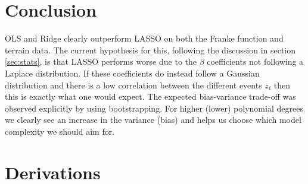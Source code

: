 \documentclass[%
reprint,
amsmath,amssymb,
aps,
pra,
]{revtex4-2}
\begin{document}
\section{Conclusion}
OLS and Ridge clearly outperform LASSO on both the Franke function and terrain data. The current hypothesis for this, following the discussion in section \ref{sec:stats}, is that LASSO performs worse due to the $\beta$ coefficients not following a Laplace distribution. If these coefficients do instead follow a Gaussian distribution and there is a low correlation between the different events $z_i$ then this is exactly what one would expect. The expected bias-variance trade-off was observed explicitly by using bootstrapping. For higher (lower) polynomial degrees we clearly see an increase in the variance (bias) and helps us choose which model complexity we should aim for. 










\appendix
\section{Derivations}
\label{Appendix:Derivations}
\end{document}
